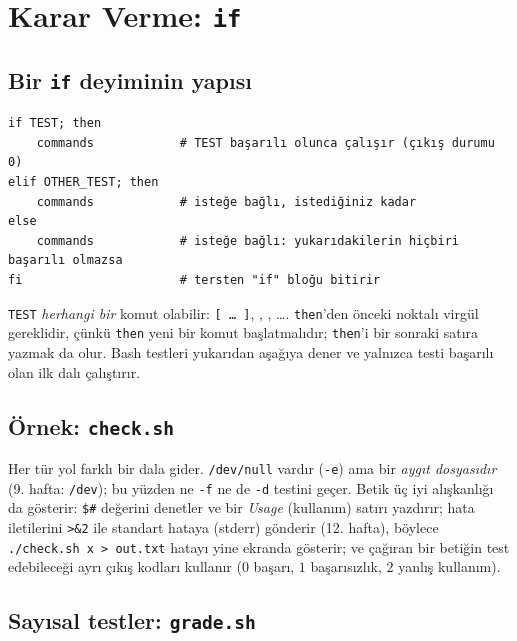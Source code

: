 \section{Karar Verme: \texttt{if}}

\subsection{Bir \texttt{if} deyiminin yapısı}

\begin{lstlisting}[style=sh,numbers=none]
if TEST; then
    commands            # TEST başarılı olunca çalışır (çıkış durumu 0)
elif OTHER_TEST; then
    commands            # isteğe bağlı, istediğiniz kadar
else
    commands            # isteğe bağlı: yukarıdakilerin hiçbiri başarılı olmazsa
fi                      # tersten "if" bloğu bitirir
\end{lstlisting}
\texttt{TEST} \emph{herhangi bir} komut olabilir: \texttt{[ \ldots\ ]}, , , \ldots. \texttt{then}'den önceki noktalı virgül gereklidir, çünkü \texttt{then} yeni bir komut başlatmalıdır; \texttt{then}'i bir sonraki satıra yazmak da olur. Bash testleri yukarıdan aşağıya dener ve yalnızca testi başarılı olan ilk dalı çalıştırır.

\subsection{Örnek: \texttt{check.sh}}




Her tür yol farklı bir dala gider. \texttt{/dev/null} vardır (\texttt{-e}) ama bir \emph{aygıt dosyasıdır} (9. hafta: \texttt{/dev}); bu yüzden ne \texttt{-f} ne de \texttt{-d} testini geçer. Betik üç iyi alışkanlığı da gösterir: \texttt{\$\#} değerini denetler ve bir \emph{Usage} (kullanım) satırı yazdırır; hata iletilerini \texttt{>\&2} ile standart hataya (stderr) gönderir (12. hafta), böylece \texttt{./check.sh x > out.txt} hatayı yine ekranda gösterir; ve çağıran bir betiğin test edebileceği ayrı çıkış kodları kullanır ($0$ başarı, $1$ başarısızlık, $2$ yanlış kullanım).

\subsection{Sayısal testler: \texttt{grade.sh}}

